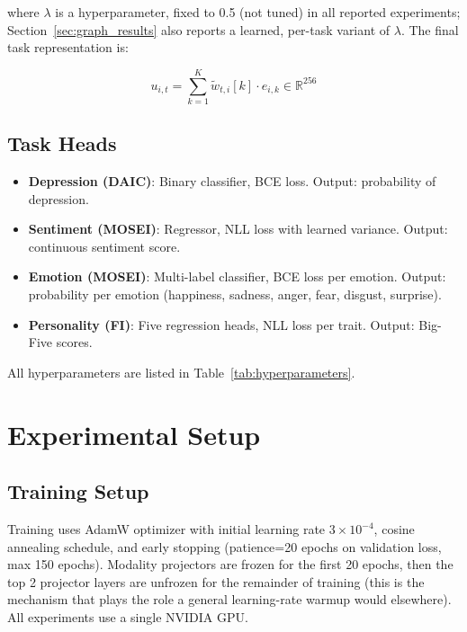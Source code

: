 \documentclass[12pt,oneside]{book}
\begin{document}
where $\lambda$ is a hyperparameter, fixed to 0.5 (not tuned) in all reported experiments; Section~\ref{sec:graph_results} also reports a learned, per-task variant of $\lambda$. The final task representation is:

\begin{equation}
    u_{i,t} = \sum_{k=1}^K \tilde{w}_{t,i}[k] \cdot e_{i,k} \in \mathbb{R}^{256}
\end{equation}

\subsection{Task Heads}

\begin{itemize}
    \item \textbf{Depression (DAIC)}: Binary classifier, BCE loss. Output: probability of depression.
    \item \textbf{Sentiment (MOSEI)}: Regressor, NLL loss with learned variance. Output: continuous sentiment score.
    \item \textbf{Emotion (MOSEI)}: Multi-label classifier, BCE loss per emotion. Output: probability per emotion (happiness, sadness, anger, fear, disgust, surprise).
    \item \textbf{Personality (FI)}: Five regression heads, NLL loss per trait. Output: Big-Five scores.
\end{itemize}

All hyperparameters are listed in Table~\ref{tab:hyperparameters}.



\section{Experimental Setup}
\label{sec:setup}

\subsection{Training Setup}
\label{sec:training_setup}

Training uses AdamW optimizer with initial learning rate $3\times10^{-4}$, cosine annealing schedule, and early stopping (patience=20 epochs on validation loss, max 150 epochs). Modality projectors are frozen for the first 20 epochs, then the top 2 projector layers are unfrozen for the remainder of training (this is the mechanism that plays the role a general learning-rate warmup would elsewhere). All experiments use a single NVIDIA GPU.
\end{document}
